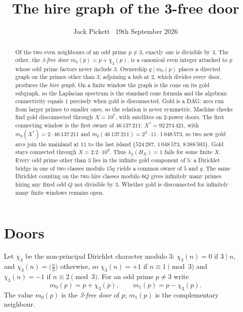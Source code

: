 \documentclass[11pt,a4paper]{article}
\title{The hire graph of the 3-free door}
\author{Jack Pickett \textperiodcentered\ 19th September 2026}
\date{}
\begin{document}
\maketitle
\thispagestyle{empty}

\begin{abstract}
Of the two even neighbours of an odd prime \(p\neq 3\), exactly one is divisible by \(3\).
The other, the \emph{3-free door} \(m_0(p)=p+\chi_3(p)\), is a canonical even integer attached to \(p\) whose odd prime factors never include \(3\).
Ownership \(q\mid m_0(p)\) places a directed graph on the primes other than \(3\); adjoining a hub at \(2\), which divides every door, produces the \emph{hire graph}.
On a finite window the graph is the cone on its gold subgraph, so the Laplacian spectrum is the standard cone formula and the algebraic connectivity equals \(1\) precisely when gold is disconnected.
Gold is a DAG: arcs run from larger primes to smaller ones, so the relation is never symmetric.
Machine checks find gold disconnected through \(X=10^7\), with satellites on \(2\)-power doors.
The first connecting window is the first owner of \(46\,137\,211\):
\(X^*=92\,274\,421\), with \(m_0(X^*)=2\cdot 46\,137\,211\) and \(m_0(46\,137\,211)=2^2\cdot 11\cdot 1\,048\,573\),
so two new gold arcs join the mainland at \(11\) to the last island \(\{524\,287,\,1\,048\,573,\,8\,388\,593\}\).
Gold stays connected through \(X=2.2\cdot 10^9\).
Thus \(\lambda_2(H_X)=1\) fails for some finite \(X\).
Every odd prime other than \(3\) lies in the infinite gold component of \(5\): a Dirichlet bridge in one of two classes modulo \(15q\) yields a common owner of \(5\) and \(q\).
The same Dirichlet counting on the two hire classes modulo \(6Q\) gives infinitely many primes hiring any fixed odd \(Q\) not divisible by \(3\).
Whether gold is disconnected for infinitely many finite windows remains open.
\end{abstract}

\section{Doors}

Let \(\chi_3\) be the non-principal Dirichlet character modulo \(3\): \(\chi_3(n)=0\) if \(3\mid n\), and \(\chi_3(n)=\bigl(\frac{n}{3}\bigr)\) otherwise, so \(\chi_3(n)=+1\) if \(n\equiv 1\pmod{3}\) and \(\chi_3(n)=-1\) if \(n\equiv 2\pmod{3}\).
For an odd prime \(p\neq 3\) write
\[
m_0(p)=p+\chi_3(p),\qquad m_1(p)=p-\chi_3(p).
\]
The value \(m_0(p)\) is the \emph{3-free door} of \(p\); \(m_1(p)\) is the complementary neighbour.
\end{document}
